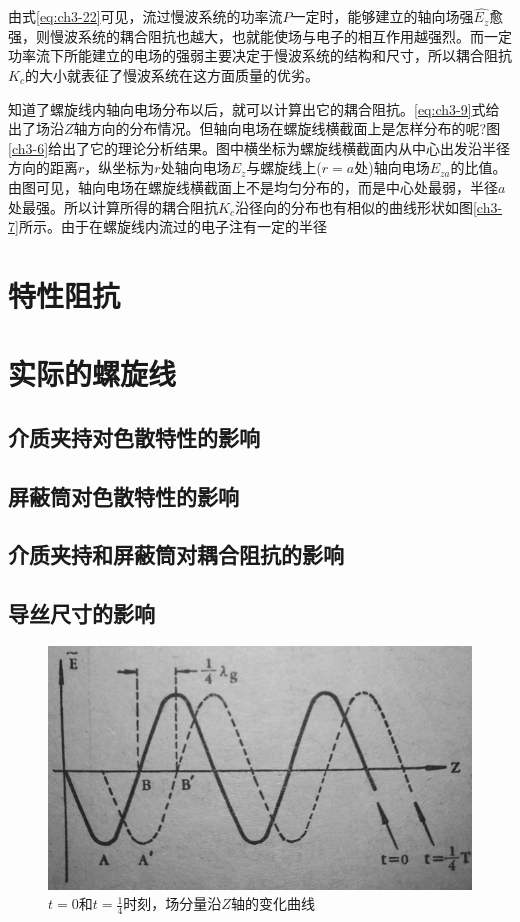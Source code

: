 由式\ref{eq:ch3-22}可见，流过慢波系统的功率流$ P $一定时，能够建立的轴向场强$ \hat{E_z} $愈强，则慢波系统的耦合阻抗也越大，也就能使场与电子的相互作用越强烈。而一定功率流下所能建立的电场的强弱主要决定于慢波系统的结构和尺寸，所以耦合阻抗$ K_c $的大小就表征了慢波系统在这方面质量的优劣。

知道了螺旋线内轴向电场分布以后，就可以计算出它的耦合阻抗。\ref{eq:ch3-9}式给出了场沿$ Z $轴方向的分布情况。但轴向电场在螺旋线横截面上是怎样分布的呢?图\ref{ch3-6}给出了它的理论分析结果。图中横坐标为螺旋线横截面内从中心出发沿半径方向的距离$ r $，纵坐标为$ r $处轴向电场$ E_z $与螺旋线上($ r=a $处)轴向电场$ E_{za} $的比值。由图可见，轴向电场在螺旋线横截面上不是均匀分布的，而是中心处最弱，半径$ a $处最强。所以计算所得的耦合阻抗$ K_c $沿径向的分布也有相似的曲线形状如图\ref{ch3-7}所示。由于在螺旋线内流过的电子注有一定的半径


\section{特性阻抗}
\section{实际的螺旋线}
\subsection{介质夹持对色散特性的影响}
\subsection{屏蔽筒对色散特性的影响}
\subsection{介质夹持和屏蔽筒对耦合阻抗的影响}
\subsection{导丝尺寸的影响}





\begin{figure}[phtb]
	\centering
	\includegraphics[width=0.65\linewidth]{figure/ch3-3}
	\caption{$ t=0 $和$ t=\frac{1}{4}$时刻，场分量沿$ Z $轴的变化曲线}
	\label{ch3-3}
\end{figure}

